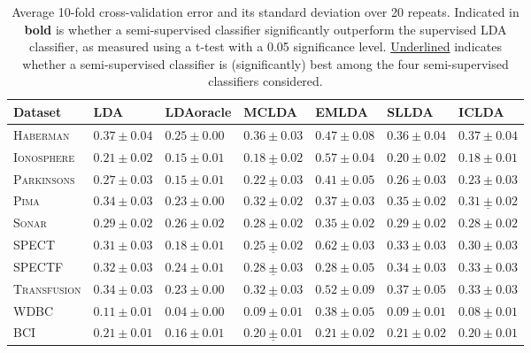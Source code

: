\documentclass[twoside]{memoir}\usepackage[]{graphicx}\usepackage{xcolor}
\begin{document}
\begin{table}
\caption{Average 10-fold cross-validation error and its standard deviation over 20 repeats. Indicated in \textbf{bold} is whether a semi-supervised classifier significantly outperform the supervised LDA classifier, as measured using a t-test with a 0.05 significance level. \underline{Underlined} indicates whether a semi-supervised classifier is (significantly) best among the four semi-supervised classifiers considered.} \label{table:cvresults-error}
\centering
\footnotesize\begin{tabular}{lllllll}
\toprule
Dataset & LDA & LDAoracle & MCLDA & EMLDA & SLLDA & ICLDA \\ 
\midrule
\textsc{ Haberman }& $0.37 \pm 0.04$& $0.25 \pm 0.00$& $0.36 \pm 0.03$& $0.47 \pm 0.08$& $0.36 \pm 0.04$& $0.37 \pm 0.04$\\ 
\textsc{ Ionosphere }& $0.21 \pm 0.02$& $0.15 \pm 0.01$& $\mathbf{\underline{0.18 \pm 0.02}} $& $0.57 \pm 0.04$& $0.20 \pm 0.02$& $\mathbf{0.18 \pm 0.01} $\\ 
\textsc{ Parkinsons }& $0.27 \pm 0.03$& $0.15 \pm 0.01$& $\mathbf{\underline{0.22 \pm 0.03}} $& $0.41 \pm 0.05$& $0.26 \pm 0.03$& $\mathbf{0.23 \pm 0.03} $\\ 
\textsc{ Pima }& $0.34 \pm 0.03$& $0.23 \pm 0.00$& $\mathbf{0.32 \pm 0.02} $& $0.37 \pm 0.03$& $0.35 \pm 0.02$& $\mathbf{\underline{0.31 \pm 0.02}} $\\ 
\textsc{ Sonar }& $0.29 \pm 0.02$& $0.26 \pm 0.02$& $0.28 \pm 0.02$& $0.35 \pm 0.02$& $0.29 \pm 0.02$& $0.28 \pm 0.02$\\ 
\textsc{ SPECT }& $0.31 \pm 0.03$& $0.18 \pm 0.01$& $\mathbf{\underline{0.25 \pm 0.02}} $& $0.62 \pm 0.03$& $0.33 \pm 0.03$& $0.30 \pm 0.03$\\ 
\textsc{ SPECTF }& $0.32 \pm 0.03$& $0.24 \pm 0.01$& $\mathbf{\underline{0.28 \pm 0.03}} $& $\mathbf{0.28 \pm 0.05} $& $0.34 \pm 0.03$& $0.33 \pm 0.03$\\ 
\textsc{ Transfusion }& $0.34 \pm 0.03$& $0.23 \pm 0.00$& $\mathbf{\underline{0.32 \pm 0.03}} $& $0.52 \pm 0.09$& $0.37 \pm 0.05$& $0.33 \pm 0.03$\\ 
\textsc{ WDBC }& $0.11 \pm 0.01$& $0.04 \pm 0.00$& $\mathbf{0.09 \pm 0.01} $& $0.38 \pm 0.05$& $\mathbf{0.09 \pm 0.01} $& $\mathbf{\underline{0.08 \pm 0.01}} $\\ 
\textsc{ BCI }& $0.21 \pm 0.01$& $0.16 \pm 0.01$& $\mathbf{\underline{0.20 \pm 0.01}} $& $0.21 \pm 0.02$& $0.21 \pm 0.02$& $\mathbf{0.20 \pm 0.01} $\\ 
\bottomrule
\end{tabular}
\end{table}
\end{document}
